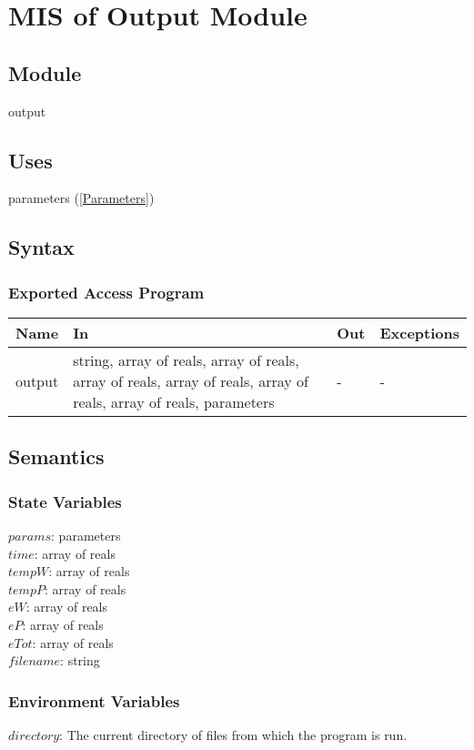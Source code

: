 \documentclass[12pt]{article}
\begin{document}
\section{MIS of Output Module} \label{Output}
\subsection{Module}
output
\subsection{Uses}
parameters (\ref{Parameters})
\subsection{Syntax}
\subsubsection{Exported Access Program}
\begin{center}
\begin{tabular}{p{3cm} p{7cm} p{2cm} p{2cm}}
\hline
\textbf{Name} & \textbf{In} & \textbf{Out} & \textbf{Exceptions} \\
\hline
output & string, array of reals, array of reals, array of reals, array of reals, array of reals, array of reals, parameters & - & - \\
\hline
\end{tabular}
\end{center}
\subsection{Semantics}
\subsubsection{State Variables}
$params$: parameters \\
$time$: array of reals \\
$tempW$: array of reals \\
$tempP$: array of reals \\
$eW$: array of reals \\
$eP$: array of reals \\
$eTot$: array of reals \\
$filename$: string
\subsubsection{Environment Variables}
$directory$: The current directory of files from which the program is run.
\end{document}
